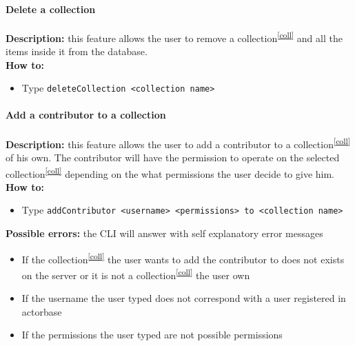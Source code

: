 \documentclass{scalatekids-article}
\begin{document}
\paragraph{Delete a collection}
\label{sec:deletecollection}
\textbf{Description:} this feature allows the user to remove a collection\textsuperscript{\ref{coll}} and all the items inside it from the database.\\
\textbf{How to:}
\begin{itemize}
\item Type \texttt{deleteCollection <collection name>}
\end{itemize}

\paragraph{Add a contributor to a collection}
\label{sec:addcontributor}
\textbf{Description:} this feature allows the user to add a contributor
to a collection\textsuperscript{\ref{coll}} of his own. The contributor will have the permission to operate on the selected collection\textsuperscript{\ref{coll}} depending on the what permissions the user decide to give him.\\
\textbf{How to:}
\begin{itemize}
\item Type \texttt{addContributor <username> <permissions> to <collection name>}
\end{itemize}
\textbf{Possible errors:} the CLI will answer with self explanatory error messages
\begin{itemize}
\item If the collection\textsuperscript{\ref{coll}} the user wants to add the contributor to does not exists on the server or it is not a collection\textsuperscript{\ref{coll}} the user own
\item If the username the user typed does not correspond with a user registered in actorbase
\item If the permissions the user typed are not possible permissions
\end{itemize}
\end{document}
